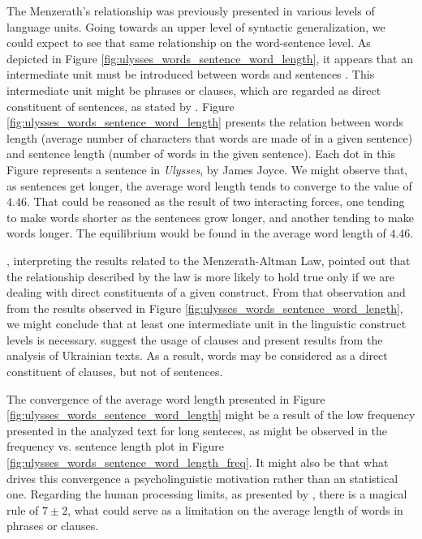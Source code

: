 

The Menzerath's relationship was previously presented in various levels of language units.
Going towards an upper level of syntactic generalization, we could expect to see that same relationship
on the word-sentence level. As depicted in Figure \ref{fig:ulysses_words_sentence_word_length},
it appears that an intermediate unit must be introduced between words and sentences \citep{kohler2005}.
This intermediate unit might be phrases or clauses, which are regarded as direct constituent of
sentences, as stated by \cite{grzybek2006}. Figure \ref{fig:ulysses_words_sentence_word_length} presents the
relation between words length (average number of characters that words are made of in a given sentence)
and sentence length (number of words in the given sentence). Each dot in this Figure represents 
a sentence in \textit{Ulysses}, by James Joyce. We might observe that, as sentences get longer,
the average word length tends to converge to the value of $4.46$. That could be reasoned as 
the result of two interacting forces, one tending to make words shorter as the sentences grow
longer, and another tending to make words longer. The equilibrium would be found in the
average word length of $4.46$. 

\cite{altmann1983}, interpreting the results related to the Menzerath-Altman Law, pointed out that
the relationship described by the law is more likely to hold true only if we are dealing with
direct constituents of a given construct.
From that observation and from the results observed in Figure \ref{fig:ulysses_words_sentence_word_length}, 
we might conclude that at least one intermediate
unit in the linguistic construct levels is necessary. \cite{buk2007} suggest the usage of clauses
and present results from the analysis of Ukrainian texts.
As a result, words may be considered as a direct constituent of clauses, but not of sentences.

The convergence of the average word length presented in Figure \ref{fig:ulysses_words_sentence_word_length}
might be a result of the low frequency presented in the analyzed text for long senteces,
as might be observed in the frequency vs. sentence length plot in Figure \ref{fig:ulysses_words_sentence_word_length_freq}.
It might also be that what drives this convergence a psycholinguistic motivation rather than an statistical one.
Regarding the human processing limits, as presented by \cite{miller1956}, there is a magical rule of
$7 \pm 2$, what could serve as a limitation on the average length of words in phrases or clauses.
 

